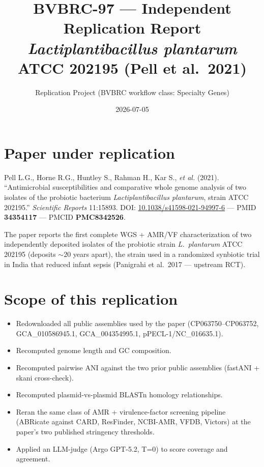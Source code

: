 \documentclass[11pt,letterpaper]{article}
\title{BVBRC-97 --- Independent Replication Report\\
\large \textit{Lactiplantibacillus plantarum} ATCC 202195 (Pell et al.\ 2021)}
\author{Replication Project (BVBRC workflow class: Specialty Genes)}
\date{2026-07-05}
\begin{document}
\maketitle

\begin{center}
\end{center}

\section{Paper under replication}

Pell L.G., Horne R.G., Huntley S., Rahman H., Kar S., \textit{et al.} (2021).
``Antimicrobial susceptibilities and comparative whole genome analysis of two isolates
of the probiotic bacterium \textit{Lactiplantibacillus plantarum}, strain ATCC 202195.''
\textit{Scientific Reports} 11:15893.
DOI: \href{https://doi.org/10.1038/s41598-021-94997-6}{10.1038/s41598-021-94997-6} ---
PMID \textbf{34354117} --- PMCID \textbf{PMC8342526}.

The paper reports the first complete WGS + AMR/VF characterization of two independently
deposited isolates of the probiotic strain \textit{L.\ plantarum} ATCC 202195 (deposits
${\sim}20$ years apart), the strain used in a randomized synbiotic trial in India that
reduced infant sepsis (Panigrahi et al.\ 2017 --- upstream RCT).

\section{Scope of this replication}

\begin{itemize}[nosep]
  \item Redownloaded all public assemblies used by the paper (CP063750--CP063752,
        GCA\_010586945.1, GCA\_004354995.1, pPECL-1/NC\_016635.1).
  \item Recomputed genome length and GC composition.
  \item Recomputed pairwise ANI against the two prior public assemblies (fastANI + skani cross-check).
  \item Recomputed plasmid-vs-plasmid BLASTn homology relationships.
  \item Reran the same class of AMR + virulence-factor screening pipeline
        (ABRicate against CARD, ResFinder, NCBI-AMR, VFDB, Victors) at the paper's
        two published stringency thresholds.
  \item Applied an LLM-judge (Argo GPT-5.2, T=0) to score coverage and agreement.
\end{itemize}
\end{document}
